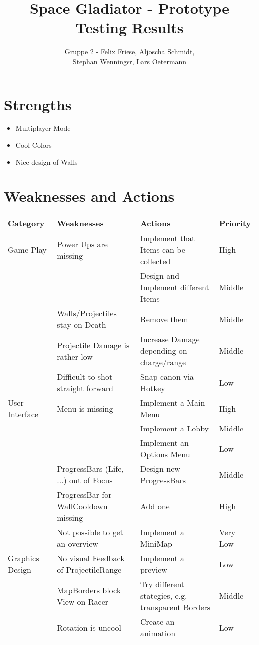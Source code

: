 \documentclass[10pt,a4paper]{article}
\author{Gruppe 2 - Felix Friese, Aljoscha Schmidt,\\Stephan Wenninger, Lars Oetermann}
\title{Space Gladiator - Prototype Testing Results}
\begin{document}
\maketitle
\section{Strengths}
\begin{itemize}
 \item Multiplayer Mode
 \item Cool Colors
 \item Nice design of Walls
\end{itemize}

\section{Weaknesses and Actions}
\begin{tabular}{ l | l | l | l }
\textbf{Category} & \textbf{Weaknesses} & \textbf{Actions} & \textbf{Priority} \\
\hline                                          
Game Play & Power Ups are missing & Implement that Items can be collected & High \\
& & Design and Implement different Items & Middle \\
\hline
& Walls/Projectiles stay on Death & Remove them & Middle \\
\hline
& Projectile Damage is rather low & Increase Damage depending on charge/range & Middle \\
\hline
& Difficult to shot straight forward & Snap canon via Hotkey & Low \\
\hline
User Interface & Menu is missing & Implement a Main Menu & High \\
& & Implement a Lobby & Middle \\
& & Implement an Options Menu & Low \\
\hline
& ProgressBars (Life, ...) out of Focus & Design new ProgressBars & Middle \\
\hline
& ProgressBar for WallCooldown missing & Add one & High \\
\hline
& Not possible to get an overview & Implement a MiniMap & Very Low \\
\hline
Graphics Design & No visual Feedback of ProjectileRange & Implement a preview & Low \\
\hline
& MapBorders block View on Racer & Try different stategies, e.g. transparent Borders & Middle \\
\hline
& Rotation is uncool & Create an animation & Low

\end{tabular}
\end{document}
